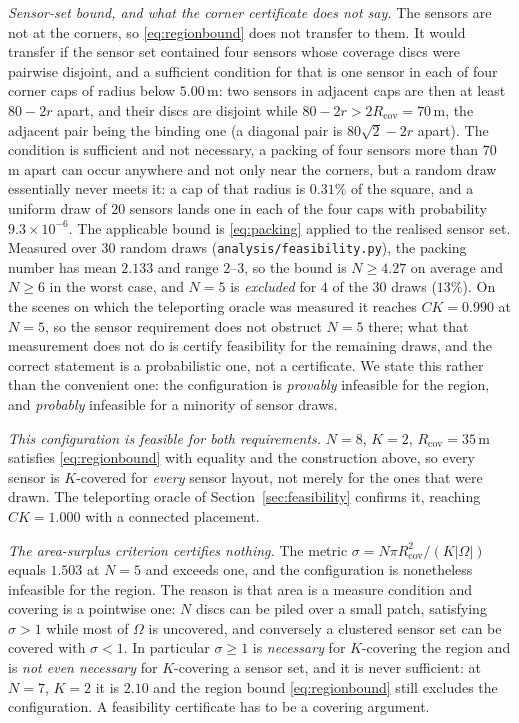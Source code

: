 \documentclass[conference]{IEEEtran}
\newcommand{\tokCapP}{9.3\times 10^{-6}}
\newcommand{\tokCapPct}{0.31}
\newcommand{\tokCapR}{5.00}
\newcommand{\tokCapTwoR}{70}
\newcommand{\tokInfOracle}{0.990}
\newcommand{\tokPackExcluded}{4}
\newcommand{\tokPackExclPct}{13}
\newcommand{\tokPackMax}{3}
\newcommand{\tokPackMean}{2.133}
\newcommand{\tokPackMin}{2}
\newcommand{\tokPackNMax}{6}
\newcommand{\tokPackNMean}{4.27}
\newcommand{\tokPackSeeds}{30}
\begin{document}
\emph{Sensor-set bound, and what the corner certificate does not say.} The
sensors are not at the corners, so \eqref{eq:regionbound} does not transfer
to them.  It would transfer if the sensor set contained four sensors whose
coverage discs were pairwise disjoint, and a sufficient condition for that
is one sensor in each of four corner caps of radius below
$\tokCapR\,\mathrm{m}$: two sensors in adjacent caps are then at least
$80-2r$ apart, and their discs are disjoint while
$80-2r>2R_{\mathrm{cov}}=\tokCapTwoR\,\mathrm{m}$, the adjacent pair
being the binding one (a diagonal pair is $80\sqrt2-2r$ apart).  The
condition is sufficient and not necessary, a packing of four sensors
more than $\tokCapTwoR$ m apart can occur anywhere and not only near the
corners, but a random draw essentially never meets it: a cap of that
radius is $\tokCapPct\%$ of the square, and a uniform draw of $20$ sensors
lands one in each of the four caps with probability $\tokCapP$.  The
applicable bound is \eqref{eq:packing} applied to the realised sensor set.
Measured over $\tokPackSeeds$ random draws
(\texttt{analysis/feasibility.py}), the packing number has mean
$\tokPackMean$ and range $\tokPackMin$--$\tokPackMax$, so the bound is
$N\ge \tokPackNMean$ on average and $N\ge \tokPackNMax$ in the worst
case, and $N=5$ is \emph{excluded} for $\tokPackExcluded$ of the
$\tokPackSeeds$ draws ($\tokPackExclPct\%$).  On the scenes on which the
teleporting oracle was measured it reaches $CK=\tokInfOracle$ at $N=5$, so
the sensor requirement does not obstruct $N=5$ there; what that
measurement does not do is certify feasibility for the remaining draws,
and the correct statement is a probabilistic one, not a certificate.  We state this rather than the
convenient one: the configuration is \emph{provably} infeasible for the
region, and
\emph{probably} infeasible for a minority of sensor draws.

\emph{This configuration is feasible for both requirements.}
$N=8$, $K=2$, $R_{\mathrm{cov}}=35$\,m satisfies \eqref{eq:regionbound}
with equality and the construction above, so every sensor is $K$-covered
for \emph{every} sensor layout, not merely for the ones that were drawn.
The teleporting oracle of Section~\ref{sec:feasibility} confirms it,
reaching $CK=1.000$ with a connected placement.

\emph{The area-surplus criterion certifies nothing.} The metric
$\sigma=N\pi R_{\mathrm{cov}}^{2}/(K|\Omega|)$ equals $1.503$ at $N=5$ and
exceeds one, and the configuration is nonetheless infeasible for the region.
The reason is that area is a measure condition and covering is a pointwise
one: $N$ discs can be piled over a small patch, satisfying $\sigma>1$ while
most of $\Omega$ is uncovered, and conversely a clustered sensor set can be
covered with $\sigma<1$.  In particular $\sigma\ge1$ is \emph{necessary}
for $K$-covering the region and is \emph{not even necessary} for
$K$-covering a sensor set, and it is never sufficient: at $N=7$, $K=2$ it is
$2.10$ and the region bound \eqref{eq:regionbound} still excludes the
configuration.  A feasibility certificate has to be a covering argument.
\end{document}
